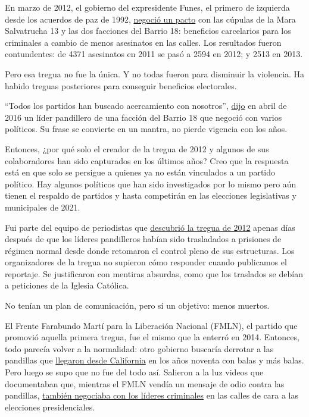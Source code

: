 En marzo de 2012, el gobierno del expresidente Funes, el primero de
izquierda desde los acuerdos de paz de 1992,
\href{https://www.elfaro.net/es/201203/noticias/7985/}{negoció un pacto}
con las cúpulas de la Mara Salvatrucha 13 y las dos facciones del Barrio
18: beneficios carcelarios para los criminales a cambio de menos
asesinatos en las calles. Los resultados fueron contundentes: de 4371
asesinatos en 2011 se pasó a 2594 en 2012; y 2513 en 2013.

Pero esa tregua no fue la única. Y no todas fueron para disminuir la
violencia. Ha habido treguas posteriores para conseguir beneficios
electorales.

``Todos los partidos han buscado acercamiento con nosotros'',
\href{https://elfaro.net/es/201604/salanegra/18347/\%E2\%80\%9CTodos-los-partidos-han-buscado-acercamientos-con-nosotros\%E2\%80\%9D.htm}{dijo}
en abril de 2016 un líder pandillero de una facción del Barrio 18 que
negoció con varios políticos. Su frase se convierte en un mantra, no
pierde vigencia con los años.

Entonces, ¿por qué solo el creador de la tregua de 2012 y algunos de sus
colaboradores han sido capturados en los últimos años? Creo que la
respuesta está en que solo se persigue a quienes ya no están vinculados
a un partido político. Hay algunos políticos que han sido investigados
por lo mismo pero aún tienen el respaldo de partidos y hasta competirán
en las elecciones legislativas y municipales de 2021.

Fui parte del equipo de periodistas que
\href{http://www.salanegra.elfaro.net/es/201209/cronicas/9612/La-nueva-verdad-sobre-la-Tregua-entre-pandillas.htm}{descubrió
la tregua de 2012} apenas días después de que los líderes pandilleros
habían sido trasladados a prisiones de régimen normal desde donde
retomaron el control pleno de sus estructuras. Los organizadores de la
tregua no supieron cómo responder cuando publicamos el reportaje. Se
justificaron con mentiras absurdas, como que los traslados se debían a
peticiones de la Iglesia Católica.

No tenían un plan de comunicación, pero sí un objetivo: menos muertos.

El Frente Farabundo Martí para la Liberación Nacional (FMLN), el partido
que promovió aquella primera tregua, fue el mismo que la enterró en
2014. Entonces, todo parecía volver a la normalidad: otro gobierno
buscaría derrotar a las pandillas que
\href{https://www.nytimes3xbfgragh.onion/es/2018/02/18/espanol/opinion/opinion-martinez-mara-ms-13-trump.html}{llegaron
desde California} en los años noventa con balas y más balas. Pero luego
se supo que no fue del todo así. Salieron a la luz videos que
documentaban que, mientras el FMLN vendía un mensaje de odio contra las
pandillas,
\href{https://elfaro.net/es/206005/salanegra/18560/El-FMLN-hizo-alianza-con-las-pandillas-para-la-elecci\%C3\%B3n-presidencial-de-2014.htm}{también
negociaba con los líderes criminales} en las calles de cara a las
elecciones presidenciales.


